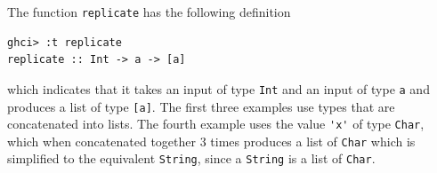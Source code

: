 The function \verb|replicate| has the following definition
\begin{lstlisting}
ghci> :t replicate
replicate :: Int -> a -> [a]
\end{lstlisting}
which indicates that it takes an input of type \verb|Int| and an input of type 
\verb|a| and produces a list of type \verb|[a]|. The first three examples use
types that are concatenated into lists. The fourth example uses the value
\verb|'x'| of type \verb|Char|, which when concatenated together 3 times produces
a list of \verb|Char| which is simplified to the equivalent \verb|String|, since
a \verb|String| is a list of \verb|Char|.
